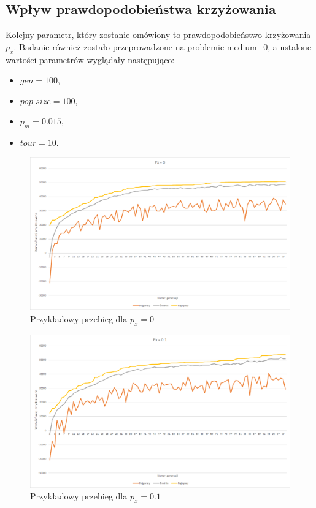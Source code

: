 \documentclass{article}
\begin{document}
	\subsection{Wpływ prawdopodobieństwa krzyżowania}
	Kolejny parametr, który zostanie omówiony to prawdopodobieństwo krzyżowania $p_x$. Badanie również zostało przeprowadzone na problemie medium\_0, a ustalone wartości parametrów wyglądały następująco:
	\begin{itemize}
		\item $gen = 100$,
		\item $pop\_size = 100$,
		\item $p_m = 0.015$,
		\item $tour = 10$.
	\end{itemize}

	\begin{figure}[H]
		\centering
		\includegraphics[width=1\linewidth]{cross0.png}
		\caption{Przykładowy przebieg dla $p_x=0$}
		\label{fig:px0}
	\end{figure}
	
	
	\begin{figure}[H]
		\centering
		\includegraphics[width=1\linewidth]{cross01.png}
		\caption{Przykładowy przebieg dla $p_x=0.1$}
		\label{fig:px01}
	\end{figure}
	
\end{document}
